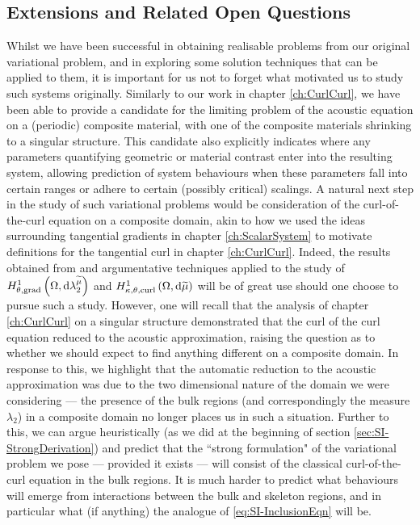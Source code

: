 \subsection{Extensions and Related Open Questions}
Whilst we have been successful in obtaining realisable problems from our original variational problem, and in exploring some solution techniques that can be applied to them, it is important for us not to forget what motivated us to study such systems originally.
Similarly to our work in chapter \ref{ch:CurlCurl}, we have been able to provide a candidate for the limiting problem of the acoustic equation on a (periodic) composite material, with one of the composite materials shrinking to a singular structure.
This candidate also explicitly indicates where any parameters quantifying geometric or material contrast enter into the resulting system, allowing prediction of system behaviours when these parameters fall into certain ranges or adhere to certain (possibly critical) scalings.
A natural next step in the study of such variational problems would be consideration of the curl-of-the-curl equation on a composite domain, akin to how we used the ideas surrounding tangential gradients in chapter \ref{ch:ScalarSystem} to motivate definitions for the tangential curl in chapter \ref{ch:CurlCurl}.
Indeed, the results obtained from and argumentative techniques applied to the study of $H^1_{\theta, \mathrm{grad}}\left( \Omega, \mathrm{d}\lambda_2^{\widetilde{\mu}} \right)$ and $H^1_{\kappa,\theta,\mathrm{curl}}\left( \Omega, \mathrm{d}\widetilde{\mu} \right)$ will be of great use should one choose to pursue such a study.
However, one will recall that the analysis of chapter \ref{ch:CurlCurl} on a singular structure demonstrated that the curl of the curl equation reduced to the acoustic approximation, raising the question as to whether we should expect to find anything different on a composite domain.
In response to this, we highlight that the automatic reduction to the acoustic approximation was due to the two dimensional nature of the domain we were considering --- the presence of the bulk regions (and correspondingly the measure $\lambda_2$) in a composite domain no longer places us in such a situation.
Further to this, we can argue heuristically (as we did at the beginning of section \ref{sec:SI-StrongDerivation}) and predict that the ``strong formulation" of the variational problem we pose --- provided it exists --- will consist of the classical curl-of-the-curl equation in the bulk regions.
It is  much harder to predict what behaviours will emerge from interactions between the bulk and skeleton regions, and in particular what (if anything) the analogue of \eqref{eq:SI-InclusionEqn} will be.

